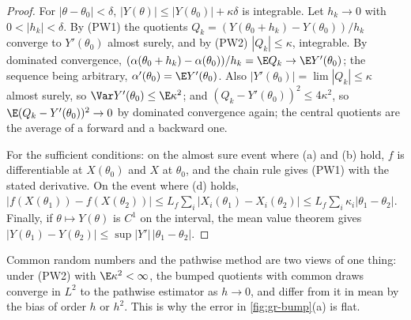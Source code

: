 \begin{proof}
For $|\theta-\theta_0|<\delta$, $|Y(\theta)|\le|Y(\theta_0)|+\kappa\delta$ is integrable. Let
$h_k\to0$ with $0<|h_k|<\delta$. By (PW1) the quotients
$Q_k=(Y(\theta_0+h_k)-Y(\theta_0))/h_k$ converge to $Y'(\theta_0)$ almost surely, and by (PW2)
$|Q_k|\le\kappa$, integrable. By dominated convergence,
$(\alpha(\theta_0+h_k)-\alpha(\theta_0))/h_k=\E Q_k\to\E Y'(\theta_0)$; the sequence being
arbitrary, $\alpha'(\theta_0)=\E Y'(\theta_0)$. Also $|Y'(\theta_0)|=\lim|Q_k|\le\kappa$ almost
surely, so $\Var Y'(\theta_0)\le\E\kappa^2$; and $(Q_k-Y'(\theta_0))^2\le4\kappa^2$, so
$\E(Q_k-Y'(\theta_0))^2\to0$ by dominated convergence again; the central quotients are the
average of a forward and a backward one.

For the sufficient conditions: on the almost sure event where (a) and (b) hold, $f$ is
differentiable at $X(\theta_0)$ and $X$ at $\theta_0$, and the chain rule gives (PW1) with the
stated derivative. On the event where (d) holds,
$|f(X(\theta_1))-f(X(\theta_2))|\le L_f\sum_i|X_i(\theta_1)-X_i(\theta_2)|\le L_f\sum_i\kappa_i|\theta_1-\theta_2|$.
Finally, if $\theta\mapsto Y(\theta)$ is $C^1$ on the interval, the mean value theorem gives
$|Y(\theta_1)-Y(\theta_2)|\le\sup|Y'|\,|\theta_1-\theta_2|$.
\end{proof}

Common random numbers and the pathwise method are two views of one thing: under (PW2) with
$\E\kappa^2<\infty$, the bumped quotients with common draws converge in $L^2$ to the pathwise
estimator as $h\to0$, and differ from it in mean by the bias of order $h$ or $h^2$. This is why
the error in \cref{fig:gr-bump}(a) is flat.

